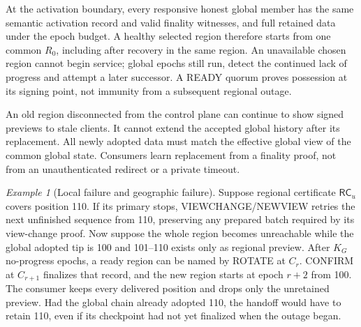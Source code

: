 \documentclass[11pt,a4paper,onecolumn]{article}
\newcommand{\RC}{\mathsf{RC}}
\theoremstyle{remark}\newtheorem{example}[definition]{Example}
\begin{document}
At the activation boundary, every responsive honest global member has the
same semantic activation record and valid finality witnesses, and full retained
data under the epoch budget. A healthy selected
region therefore starts from one common $R_0$, including after recovery in the
same region. An unavailable chosen region
cannot begin service; global epochs still run, detect the continued lack of
progress and attempt a later successor. A READY quorum proves possession at
its signing point, not immunity from a subsequent regional outage.

An old region disconnected from the control plane can continue to show signed
previews to stale clients. It cannot extend the accepted global history after
its replacement. All newly adopted data must match the effective global view
of the common global state. Consumers learn replacement from a finality proof,
not from an unauthenticated redirect or a private timeout.

\begin{example}[Local failure and geographic failure]
Suppose regional certificate $\RC_u$ covers position 110. If its primary stops,
VIEWCHANGE/NEWVIEW retries the next unfinished sequence from 110, preserving
any prepared batch required by its view-change proof. Now suppose the whole region becomes unreachable while the global
adopted tip is 100 and 101--110 exists only as regional preview. After $K_G$
no-progress epochs, a ready region can be named by ROTATE at $C_r$. CONFIRM at
$C_{r+1}$ finalizes that record, and the new region starts at epoch $r+2$ from
100. The consumer keeps every delivered position and drops only the unretained
preview. Had the global chain already adopted 110, the handoff would have to
retain 110, even if its checkpoint had not yet finalized when the outage began.
\end{example}

\end{document}
